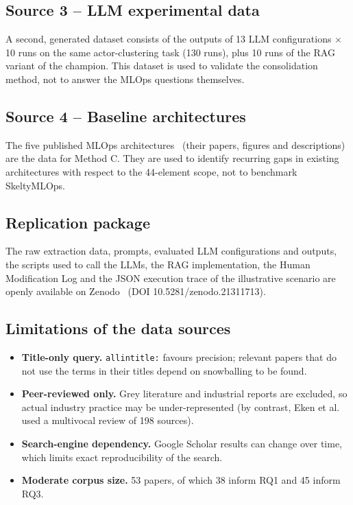 \documentclass[11pt,a4paper]{article}
\begin{document}
\subsection{Source 3 -- LLM experimental data}

A second, generated dataset consists of the outputs of 13 LLM configurations $\times$ 10 runs on the same actor-clustering task (130 runs), plus 10 runs of the RAG variant of the champion. This dataset is used to validate the consolidation method, not to answer the MLOps questions themselves.

\subsection{Source 4 -- Baseline architectures}

The five published MLOps architectures~\cite{rodrigues2025,burgueno2025,kumara2025,najafabadi2024,kreuzberger2023} (their papers, figures and descriptions) are the data for Method C. They are used to identify recurring gaps in existing architectures with respect to the 44-element scope, not to benchmark SkeltyMLOps.

\subsection{Replication package}

The raw extraction data, prompts, evaluated LLM configurations and outputs, the scripts used to call the LLMs, the RAG implementation, the Human Modification Log and the JSON execution trace of the illustrative scenario are openly available on Zenodo~\cite{zenodo} (DOI 10.5281/zenodo.21311713).

\subsection{Limitations of the data sources}

\begin{itemize}
  \item \textbf{Title-only query.} \texttt{allintitle:} favours precision; relevant papers that do not use the terms in their titles depend on snowballing to be found.
  \item \textbf{Peer-reviewed only.} Grey literature and industrial reports are excluded, so actual industry practice may be under-represented (by contrast, Eken et al.~\cite{eken2025} used a multivocal review of 198 sources).
  \item \textbf{Search-engine dependency.} Google Scholar results can change over time, which limits exact reproducibility of the search.
  \item \textbf{Moderate corpus size.} 53 papers, of which 38 inform RQ1 and 45 inform RQ3.
\end{itemize}
\end{document}
